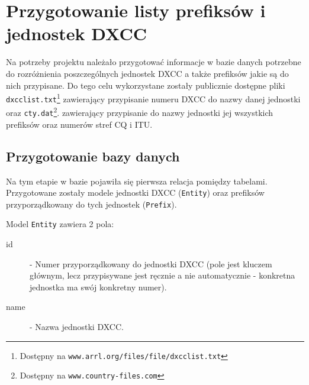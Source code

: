 \documentclass[]{mgr}
\begin{document}
        \section{Przygotowanie listy prefiksów i jednostek DXCC}
        Na potrzeby projektu należało przygotować informacje w bazie danych potrzebne do rozróżnienia poszczególnych jednostek DXCC a także prefiksów jakie są do nich przypisane. Do tego celu wykorzystane zostały publicznie dostępne pliki \texttt{dxcclist.txt}\footnote{Dostępny na \texttt{www.arrl.org/files/file/dxcclist.txt}} zawierający przypisanie numeru DXCC do nazwy danej jednostki oraz \texttt{cty.dat}\footnote{Dostępny na \texttt{www.country-files.com}}. zawierający przypisanie do nazwy jednostki jej wszystkich prefiksów oraz numerów stref CQ i ITU.

            \subsection{Przygotowanie bazy danych}
            Na tym etapie w bazie pojawiła się pierwsza relacja pomiędzy tabelami. Przygotowane zostały modele jednostki DXCC (\texttt{Entity}) oraz prefiksów przyporządkowany do tych jednostek (\texttt{Prefix}). 

            

            \noindent Model \texttt{Entity} zawiera 2 pola:
            \begin{description}
                \item[id] - Numer przyporządkowany do jednostki DXCC (pole jest kluczem głównym, lecz przypisywane jest ręcznie a nie automatycznie - konkretna jednostka ma swój konkretny numer).
                \item[name] - Nazwa jednostki DXCC.
            \end{description}

            
\end{document}
